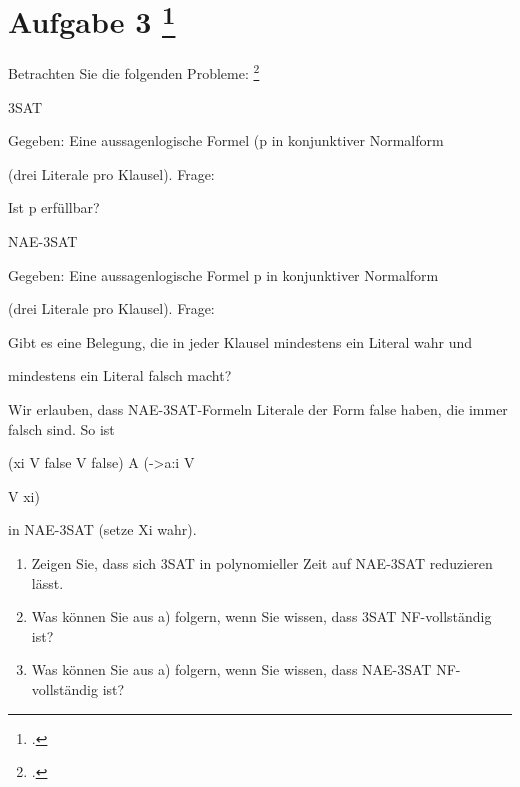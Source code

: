 \documentclass{lehramt-informatik-aufgabe}
\begin{document}
\liAufgabenTitel{}
\section{Aufgabe 3
\footcite{66115:2017:09}}

Betrachten Sie die folgenden Probleme:
\footcite[Aufgabe 15: StEx F2016 T2 A3, StEx H2017 T1 A3 (Check-Up)]{theo:ab:4}

3SAT

Gegeben: Eine aussagenlogische Formel (p in konjunktiver Normalform

(drei Literale pro Klausel).
Frage:

Ist p erfüllbar?

NAE-3SAT

Gegeben: Eine aussagenlogische Formel p in konjunktiver Normalform

(drei Literale pro Klausel).
Frage:

Gibt es eine Belegung, die in jeder Klausel
mindestens ein Literal wahr und

mindestens ein Literal falsch macht?

Wir erlauben, dass NAE-3SAT-Formeln Literale der Form false haben, die immer falsch sind.
So ist

(xi V false V false) A (->a:i V

V xi)

in NAE-3SAT (setze Xi wahr).
\begin{enumerate}


\item Zeigen Sie, dass sich 3SAT in polynomieller Zeit auf NAE-3SAT
reduzieren lässt.


\item Was können Sie aus a) folgern, wenn Sie wissen, dass 3SAT
NF-vollständig ist?


\item Was können Sie aus a) folgern, wenn Sie wissen, dass NAE-3SAT
NF-vollständig ist?

\end{enumerate}
\end{document}
